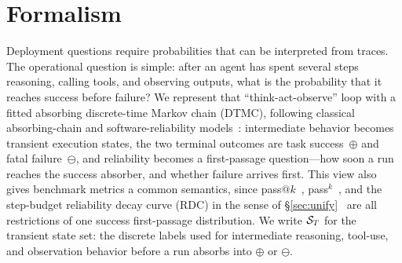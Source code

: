 \section{Formalism}
\label{sec:formal}

Deployment questions require probabilities that can be interpreted from
traces. The operational question is simple: after an agent has spent
several steps reasoning, calling tools, and observing outputs, what is
the probability that it reaches success before failure? We represent
that ``think-act-observe'' loop with a fitted absorbing discrete-time
Markov chain (DTMC), following classical absorbing-chain and
software-reliability models~\cite{kemenysnell,cheung1980}: intermediate
behavior becomes transient execution states, the two terminal outcomes
are task success~$\oplus$ and fatal failure~$\ominus$, and reliability
becomes a first-passage question---how soon a run reaches the success
absorber, and whether failure arrives first. This view also
gives benchmark metrics a common semantics, since
pass$@k$~\cite{chen2021codex}, pass$^k$~\cite{taub2024}, and the
step-budget reliability decay curve (RDC) in the sense of
\S\ref{sec:unify}~\cite{rdc2025} are all restrictions of one success
first-passage distribution. We write $\mathcal{S}_T$ for the transient state set: the discrete
labels used for intermediate reasoning, tool-use, and observation
behavior before a run absorbs into $\oplus$ or $\ominus$.

